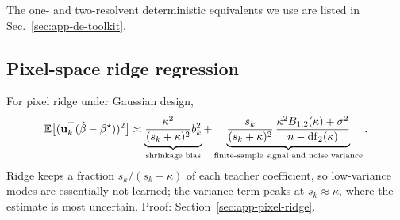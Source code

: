 The one- and two-resolvent deterministic equivalents we use are listed in Sec.~\ref{sec:app-de-toolkit}.

\subsection{Pixel-space ridge regression}

\begin{prop}
\label{prop:mr-per-pc}
For pixel ridge under Gaussian design,
\begin{equation}
\mathbb{E}\big[({\mathbf{u}}_k^\top(\hat{\beta}-{\beta^{\star}}))^2\big]\asymp
\underbrace{\frac{\kappa^2}{(s_k+\kappa)^2}b_k^2}_{\text{shrinkage bias}}
+\underbrace{\frac{s_k}{(s_k+\kappa)^2}\,
\frac{\kappa^2B_{1,2}(\kappa)+\sigma^2}{n-\mathrm{df}_2(\kappa)}}_{\text{finite-sample signal and noise variance}} .
\label{eq:mr-per-pc}
\end{equation}
Ridge keeps a fraction $s_k/(s_k+\kappa)$ of each teacher coefficient, so
low-variance modes are essentially not learned; the variance term peaks at
$s_k\approx\kappa$, where the estimate is most uncertain.
Proof: Section~\ref{sec:app-pixel-ridge}.
\end{prop}

